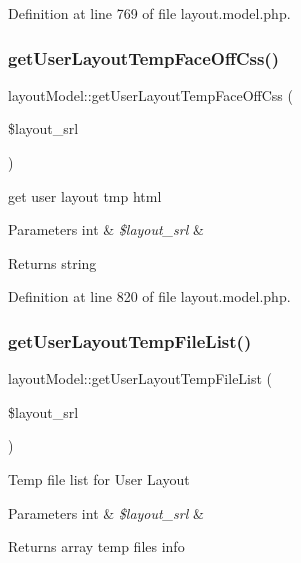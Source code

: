 Definition at line 769 of file layout.\+model.\+php.

\hypertarget{classlayoutModel_aadc68d3ed9d3706536ff8d93d1aebd56}{}\label{classlayoutModel_aadc68d3ed9d3706536ff8d93d1aebd56} 
\subsubsection{\texorpdfstring{get\+User\+Layout\+Temp\+Face\+Off\+Css()}{getUserLayoutTempFaceOffCss()}}
{\footnotesize\ttfamily layout\+Model\+::get\+User\+Layout\+Temp\+Face\+Off\+Css (\begin{DoxyParamCaption}\item[{}]{\$layout\+\_\+srl }\end{DoxyParamCaption})}

get user layout tmp html 
\begin{DoxyParams}[1]{Parameters}
int & {\em \$layout\+\_\+srl} & \\
\hline
\end{DoxyParams}
\begin{DoxyReturn}{Returns}
string 
\end{DoxyReturn}


Definition at line 820 of file layout.\+model.\+php.

\hypertarget{classlayoutModel_a64f8b7f26a864b7c64d491a83bbf3961}{}\label{classlayoutModel_a64f8b7f26a864b7c64d491a83bbf3961} 
\subsubsection{\texorpdfstring{get\+User\+Layout\+Temp\+File\+List()}{getUserLayoutTempFileList()}}
{\footnotesize\ttfamily layout\+Model\+::get\+User\+Layout\+Temp\+File\+List (\begin{DoxyParamCaption}\item[{}]{\$layout\+\_\+srl }\end{DoxyParamCaption})}

Temp file list for User Layout 
\begin{DoxyParams}[1]{Parameters}
int & {\em \$layout\+\_\+srl} & \\
\hline
\end{DoxyParams}
\begin{DoxyReturn}{Returns}
array temp files info 
\end{DoxyReturn}


